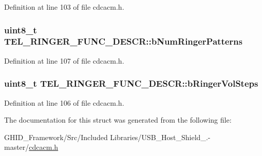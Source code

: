 \-Definition at line 103 of file cdcacm.\-h.

\hypertarget{struct_t_e_l___r_i_n_g_e_r___f_u_n_c___d_e_s_c_r_aca65dc577a0dbc13972da9ab26e25918}{
\subsubsection[{b\-Num\-Ringer\-Patterns}]{\setlength{\rightskip}{0pt plus 5cm}uint8\-\_\-t {\bf \-T\-E\-L\-\_\-\-R\-I\-N\-G\-E\-R\-\_\-\-F\-U\-N\-C\-\_\-\-D\-E\-S\-C\-R\-::b\-Num\-Ringer\-Patterns}}}\label{struct_t_e_l___r_i_n_g_e_r___f_u_n_c___d_e_s_c_r_aca65dc577a0dbc13972da9ab26e25918}


\-Definition at line 107 of file cdcacm.\-h.

\hypertarget{struct_t_e_l___r_i_n_g_e_r___f_u_n_c___d_e_s_c_r_afdbb7ff1b60803569e26718685da9196}{
\subsubsection[{b\-Ringer\-Vol\-Steps}]{\setlength{\rightskip}{0pt plus 5cm}uint8\-\_\-t {\bf \-T\-E\-L\-\_\-\-R\-I\-N\-G\-E\-R\-\_\-\-F\-U\-N\-C\-\_\-\-D\-E\-S\-C\-R\-::b\-Ringer\-Vol\-Steps}}}\label{struct_t_e_l___r_i_n_g_e_r___f_u_n_c___d_e_s_c_r_afdbb7ff1b60803569e26718685da9196}


\-Definition at line 106 of file cdcacm.\-h.



\-The documentation for this struct was generated from the following file\-:\begin{DoxyCompactItemize}
\item 
\-G\-H\-I\-D\-\_\-\-Framework/\-Src/\-Included Libraries/\-U\-S\-B\-\_\-\-Host\-\_\-\-Shield\-\_.-\/master/\hyperlink{cdcacm_8h}{cdcacm.\-h}\end{DoxyCompactItemize}
